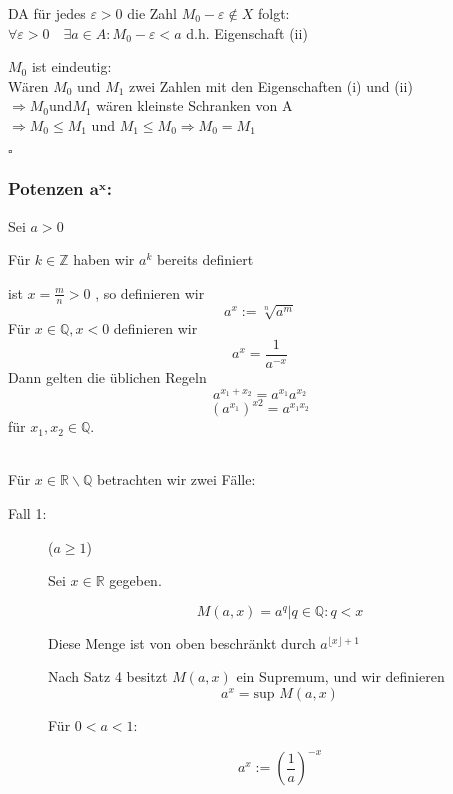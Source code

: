 \documentclass[12pt,a4paper,leqno]{article}
\begin{document}
\begin{description}
      DA für jedes $\varepsilon > 0$  die Zahl $M_0-\varepsilon\notin X $ folgt:\\
      
      $\forall \varepsilon >0 \quad \exists a \in A :M_0-\varepsilon <a$ d.h. Eigenschaft (ii)
      
      $M_0$ ist eindeutig:\\
      
      Wären $M_0$ und $M_1$ zwei Zahlen mit den Eigenschaften (i) und (ii)\\
      
      $\Rightarrow M_0 $und$ M_1$ wären kleinste Schranken von A\\
      
      $\Rightarrow M_0 \leq M_1$ und $M_1\leq M_0\Rightarrow M_0=M_1$
      \begin{flushright}$ \square $ \end{flushright}
      
  \end{description}
  
  \subsubsection*{Potenzen $\mathbf{a^x}$:} Sei $a > 0$
  
  Für $k\in \mathbb{Z}$ haben wir $a^{k}$ bereits definiert
  
  ist $x=\frac{m}{n}>0$ , so definieren wir 
  $$a^{x}:=\sqrt[n]{a^{m}}$$
  Für $x\in \mathbb{Q},x<0$ definieren wir
  $$a^{x}=\frac{1}{a^{-x}}$$
  Dann gelten die üblichen Regeln 
  $$a^{x_1+x_2}=a^{x_1}a^{x_2}$$
  $$(a^{x_1})^{x2}=a^{x_1x_2}$$
  für $x_1,x_2 \in \mathbb{Q}$.
  
  
  \hfill \\
  
  Für $x \in \mathbb{R} \backslash \mathbb{Q}$ betrachten wir zwei Fälle:
  
  \begin{description}
    \item[Fall 1:] ($a \geq 1$)
      
      Sei $x \in \mathbb{R}$ gegeben.
      
      
      $$M(a, x) = { a^q | q \in \mathbb{Q} : q < x }$$
      
      Diese Menge ist von oben beschränkt durch $a^{\lfloor x \rfloor + 1}$ %
      
      Nach Satz 4 besitzt $M(a, x)$ ein Supremum, und wir definieren 
      $$a^x = \textrm{sup } M(a,x)$$
      
      Für $0 < a < 1$:
      
      $$a^x := \left( \frac{1}{a} \right) ^{-x}$$ 
      
  \end{description}
\end{document}
